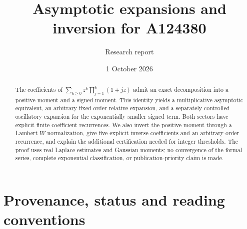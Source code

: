 \documentclass[11pt,letterpaper]{article}
\title{Asymptotic expansions and inversion for A124380}
\author{Research report}\date{1 October 2026}
\numberwithin{equation}{section}
\begin{document}
\maketitle
\begin{abstract}
The coefficients of $\sum_{k\ge0}z^k\prod_{j=1}^k(1+jz)$ admit an exact decomposition into a positive moment and a signed moment. This identity yields a multiplicative asymptotic equivalent, an arbitrary fixed-order relative expansion, and a separately controlled oscillatory expansion for the exponentially smaller signed term. Both sectors have explicit finite coefficient recurrences. We also invert the positive moment through a Lambert $W$ normalization, give five explicit inverse coefficients and an arbitrary-order recurrence, and explain the additional certification needed for integer thresholds. The proof uses real Laplace estimates and Gaussian moments; no convergence of the formal series, complete exponential classification, or publication-priority claim is made.
\end{abstract}

\section*{Provenance, status and reading conventions}\label{sma:provenance}
\end{document}

